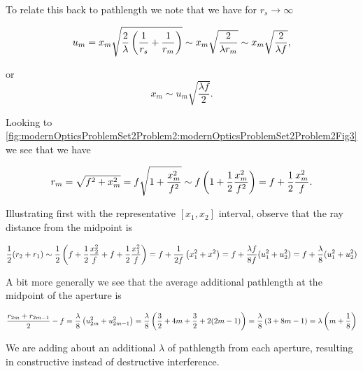 {To relate this back to pathlength we note that we have for $r_s \rightarrow \infty$

\begin{dmath}\label{eqn:modernOptics:ProblemSet2:P2:240}
u_m
= x_m \sqrt{ \frac{2}{\lambda} \left( \inv{r_s} + \inv{r_m} \right) }
\sim
x_m \sqrt{ \frac{2}{\lambda r_m} }
\sim
x_m \sqrt{ \frac{2}{\lambda f} },
\end{dmath}

or
\begin{equation}\label{eqn:modernOptics:ProblemSet2:P2:260}
x_m \sim u_m \sqrt{ \frac{\lambda f}{2} }.
\end{equation}

Looking to \cref{fig:modernOpticsProblemSet2Problem2:modernOpticsProblemSet2Problem2Fig3} we see that we have


\begin{dmath}\label{eqn:modernOptics:ProblemSet2:P2:280}
r_m
= \sqrt{f^2 + x_m^2}
= f \sqrt{ 1 + \frac{x_m^2}{f^2} }
\sim f \left( 1 + \inv{2} \frac{x_m^2}{f^2} \right)
= f + \inv{2} \frac{x_m^2}{f}.
\end{dmath}

Illustrating first with the representative $[x_1, x_2]$ interval, observe that the ray distance from the midpoint is

\begin{dmath}\label{eqn:modernOptics:ProblemSet2:P2:300}
\inv{2} (r_2 + r_1) \sim
\inv{2} \left(
f + \inv{2} \frac{x_2^2}{f}
+f + \inv{2} \frac{x_1^2}{f}
\right)
=
f + \inv{2 f} \left( x_1^2 + x^2 \right)
=
f + \frac{\lambda f}{8 f} ( u_1^2 + u_2^2 )
=
f + \frac{\lambda}{8} ( u_1^2 + u_2^2 )
\end{dmath}

A bit more generally we see that the average additional pathlength at the midpoint of the aperture is

\begin{dmath}\label{eqn:modernOptics:ProblemSet2:P2:320}
\frac{r_{2m} + r_{2m-1}}{2} - f
= \frac{\lambda}{8} \left( u_{2m}^2 + u_{2m-1}^2 \right)
= \frac{\lambda}{8} \left( \frac{3}{2} + 4 m + \frac{3}{2} + 2 (2m -1) \right)
= \frac{\lambda}{8} \left( 3 + 8 m - 1 \right)
= \lambda \left( m + \inv{8} \right)
\end{dmath}

We are adding about an additional $\lambda$ of pathlength from each aperture, resulting in constructive instead of destructive interference.

}
